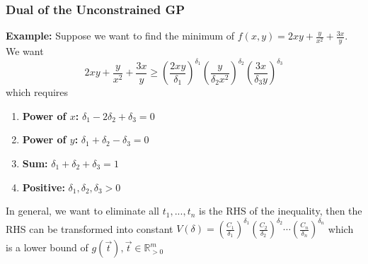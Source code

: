 \documentclass[11pt,a4paper]{article}
\begin{document}
\begin{center}
\end{center}

\subsubsection{Dual of the Unconstrained GP}
\textbf{Example:} Suppose we want to find the minimum of $f(x,y)=2xy+\frac{y}{x^2}+\frac{3x}{y}$.\\
We want $$2xy+\frac{y}{x^2}+\frac{3x}{y}\geq \left(\frac{2xy}{\delta_1}\right)^{\delta_1}\left(\frac{y}{\delta_2 x^2}\right)^{\delta_2}\left(\frac{3x}{\delta_3 y}\right)^{\delta_3}$$
which requires
\begin{enumerate}[(1)]
    \item \textbf{Power of $x$:} $\delta_1-2\delta_2+\delta_3=0$
    \item \textbf{Power of $y$:} $\delta_1+\delta_2-\delta_3=0$
    \item \textbf{Sum:} $\delta_1+\delta_2+\delta_3=1$
    \item \textbf{Positive:} $\delta_1,\delta_2,\delta_3>0$
\end{enumerate}
In general, we want to eliminate all $t_1,...,t_n$ is the RHS of the inequality, then the RHS can be transformed into constant $V(\delta)=\left(\frac{C_1}{\delta_1}\right)^{\delta_1}\left(\frac{C_2}{\delta_2}\right)^{\delta_2}\cdots\left(\frac{C_n}{\delta_n}\right)^{\delta_n}$ which is a lower bound of $g(\vec{t}),\vec{t}\in \mathbb{R}_{>0}^m$
\end{document}
